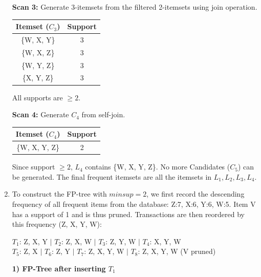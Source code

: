 \documentclass[12pt]{article}
\begin{document}
\begin{enumerate}[label=(\alph*)]
    \textbf{Scan 3:} Generate 3-itemsets from the filtered 2-itemsets using join operation. 
    \begin{center}
    \begin{tabular}{|c|c|}
        \hline
        \textbf{Itemset ($C_3$)} & \textbf{Support} \\ \hline
        \{W, X, Y\} & 3 \\ \hline
        \{W, X, Z\} & 3 \\ \hline
        \{W, Y, Z\} & 3 \\ \hline
        \{X, Y, Z\} & 3 \\ \hline
    \end{tabular}
    \end{center}
    All supports are $\ge 2$.
    
    \textbf{Scan 4:} Generate $C_4$ from self-join.
    \begin{center}
    \begin{tabular}{|c|c|}
        \hline
        \textbf{Itemset ($C_4$)} & \textbf{Support} \\ \hline
        \{W, X, Y, Z\} & 2 \\ \hline
    \end{tabular}
    \end{center}
    Since support $\ge 2$, $L_4$ contains \{W, X, Y, Z\}.
    No more Candidates ($C_5$) can be generated. The final frequent itemsets are all the itemsets in $L_1, L_2, L_3, L_4$.
    
    \newpage
    \item
    To construct the FP-tree with $minsup = 2$, we first record the descending frequency of all frequent items from the database: Z:7, X:6, Y:6, W:5. Item V has a support of 1 and is thus pruned.
    Transactions are then reordered by this frequency (Z, X, Y, W):
    
    $T_1$: Z, X, Y  $|$  $T_2$: Z, X, W  $|$  $T_3$: Z, Y, W  $|$  $T_4$: X, Y, W \\
    $T_5$: Z, X  $|$  $T_6$: Z, Y  $|$  $T_7$: Z, X, Y, W  $|$  $T_8$: Z, X, Y, W (V pruned)

    \vspace{1.5em}
    \textbf{1) FP-Tree after inserting $T_1$}
    \begin{center}
    \end{center}


\end{enumerate}
\end{document}
